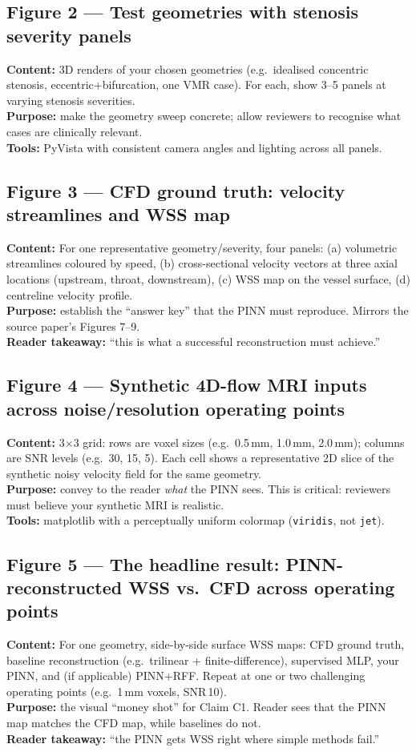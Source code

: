 \documentclass[11pt]{article}
\begin{document}
\subsection*{Figure 2 --- Test geometries with stenosis severity panels}
\textbf{Content:} 3D renders of your chosen geometries (e.g.\ idealised concentric stenosis, eccentric+bifurcation, one VMR case). For each, show 3--5 panels at varying stenosis severities.\\
\textbf{Purpose:} make the geometry sweep concrete; allow reviewers to recognise what cases are clinically relevant.\\
\textbf{Tools:} PyVista with consistent camera angles and lighting across all panels.

\subsection*{Figure 3 --- CFD ground truth: velocity streamlines and WSS map}
\textbf{Content:} For one representative geometry/severity, four panels: (a) volumetric streamlines coloured by speed, (b) cross-sectional velocity vectors at three axial locations (upstream, throat, downstream), (c) WSS map on the vessel surface, (d) centreline velocity profile.\\
\textbf{Purpose:} establish the ``answer key'' that the PINN must reproduce. Mirrors the source paper's Figures 7--9.\\
\textbf{Reader takeaway:} ``this is what a successful reconstruction must achieve.''

\subsection*{Figure 4 --- Synthetic 4D-flow MRI inputs across noise/resolution operating points}
\textbf{Content:} 3$\times$3 grid: rows are voxel sizes (e.g.\ 0.5\,mm, 1.0\,mm, 2.0\,mm); columns are SNR levels (e.g.\ 30, 15, 5). Each cell shows a representative 2D slice of the synthetic noisy velocity field for the same geometry.\\
\textbf{Purpose:} convey to the reader \emph{what} the PINN sees. This is critical: reviewers must believe your synthetic MRI is realistic.\\
\textbf{Tools:} matplotlib with a perceptually uniform colormap (\texttt{viridis}, not \texttt{jet}).

\subsection*{Figure 5 --- The headline result: PINN-reconstructed WSS vs.\ CFD across operating points}
\textbf{Content:} For one geometry, side-by-side surface WSS maps: CFD ground truth, baseline reconstruction (e.g.\ trilinear + finite-difference), supervised MLP, your PINN, and (if applicable) PINN+RFF. Repeat at one or two challenging operating points (e.g.\ 1\,mm voxels, SNR\,10).\\
\textbf{Purpose:} the visual ``money shot'' for Claim C1. Reader sees that the PINN map matches the CFD map, while baselines do not.\\
\textbf{Reader takeaway:} ``the PINN gets WSS right where simple methods fail.''
\end{document}
